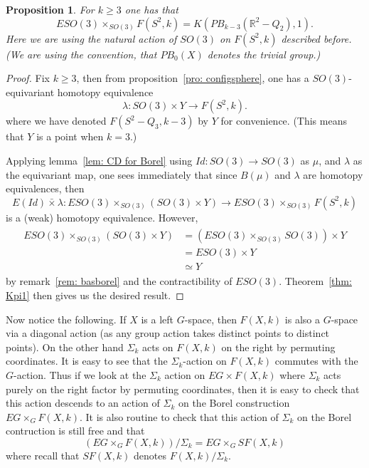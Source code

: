 \documentclass{amsart}
\newtheorem{prop}[thm]{Proposition}
\begin{document}
\begin{prop}
\label{pro: BSKpi1}
For $k \geq 3$ one has that 
$$
ESO(3) \times_{SO(3)} F(S^2,k) = K(PB_{k-3}(\mathbb{R}^2 - Q_2),1).
$$
Here we are using the natural action of $SO(3)$ on $F(S^2,k)$
described before. (We are using the convention, that $PB_0(X)$ denotes
the trivial group.) 
\end{prop}
\begin{proof}
Fix $k \geq 3$, then from proposition~\ref{pro: configsphere}, 
one has a $SO(3)$-equivariant
homotopy equivalence 
$$
\lambda: SO(3) \times Y \rightarrow F(S^2,k). 
$$ 
where we have denoted $F(S^2-Q_3,k-3)$ by $Y$ for convenience.
(This means that $Y$ is a point when $k=3$.)

Applying lemma~\ref{lem: CD for Borel} using $Id: SO(3) \rightarrow
SO(3)$ as $\mu$, and $\lambda$ as the equivariant map, one sees immediately
that since $B(\mu)$ and $\lambda$ are homotopy equivalences, then
$$
E(Id) \bar{\times} \lambda : ESO(3) \times_{SO(3)} (SO(3) \times
Y ) \rightarrow ESO(3) \times_{SO(3)} F(S^2,k)
$$
is a (weak) homotopy equivalence. However,
\begin{align*}
\begin{split}
ESO(3) \times_{SO(3)} (SO(3) \times Y)
&= (ESO(3) \times_{SO(3)} SO(3)) \times Y \\
&= ESO(3) \times Y \\
&\simeq Y 
\end{split}
\end{align*}
by remark~\ref{rem: basborel} and the contractibility of $ESO(3)$.
Theorem~\ref{thm: Kpi1} then gives us the desired result.
\end{proof}

Now notice the following. If $X$ is a left $G$-space, then
$F(X,k)$ is also a $G$-space via a diagonal action (as any group
action takes distinct points to distinct points). On the other
hand $\Sigma_k$ acts on $F(X,k)$ on the right by permuting
coordinates. It is easy to see that the $\Sigma_k$-action
on $F(X,k)$ commutes with the $G$-action. Thus if we look
at the $\Sigma_k$ action on $EG \times F(X,k)$ where
$\Sigma_k$ acts purely on the right factor by permuting coordinates,
then it is easy to check that this action descends to an
action of $\Sigma_k$ on the Borel construction $EG \times_G F(X,k)$.
It is also routine to check that this action of $\Sigma_k$ on
the Borel contruction is still free and that
$$
(EG \times_G F(X,k))/\Sigma_k = EG \times_G SF(X,k)
$$
where recall that $SF(X,k)$ denotes $F(X,k)/\Sigma_k$.
\end{document}
